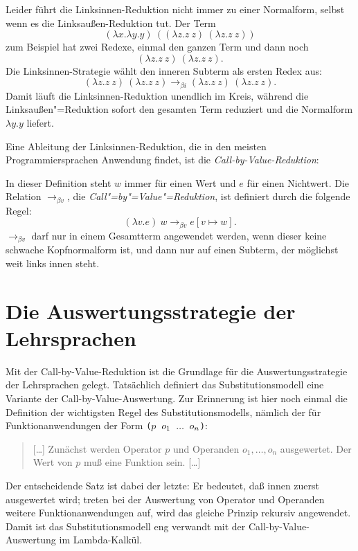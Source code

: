 %
Leider führt die Linksinnen-Reduktion nicht immer zu einer Normalform,
selbst wenn es die Linksaußen-Reduktion tut.  Der Term
\[ (\lambda x.\lambda y.y)~((\lambda z.z~z)~(\lambda z.z~z)) \]
zum Beispiel hat zwei Redexe, einmal den ganzen Term und dann noch
\[(\lambda z.z~z)~(\lambda z.z~z).\]  Die Linksinnen-Strategie wählt
den inneren Subterm als ersten Redex aus:
%
\begin{displaymath}
  (\lambda z.z~z)~(\lambda z.z~z)
\rightarrow_{\beta i}
  (\lambda z.z~z)~(\lambda z.z~z).
\end{displaymath}
%
Damit läuft die Linksinnen-Reduktion unendlich im Kreis, während
die Linksaußen"=Reduktion sofort den gesamten Term reduziert und die
Normalform $\lambda y.y$ liefert.

Eine Ableitung der Linksinnen-Reduktion, die in den meisten
Programmiersprachen Anwendung findet, ist die
\textit{Call-by-Value-Reduktion}:
%
\begin{definition}\label{def:call-by-value}
  In dieser Definition steht $w$ immer für einen Wert und $e$ für
  einen Nichtwert.  Die Relation $\rightarrow_{\beta v}$, die
  \textit{Call"=by"=Value"=Reduktion}, ist definiert durch die
  folgende Regel:
  \begin{displaymath}
    (\lambda v.e)~w \rightarrow_{\beta v} e[v \mapsto w].
  \end{displaymath}
  $\rightarrow_{\beta v}$ darf nur in einem Gesamtterm angewendet
  werden, wenn dieser keine schwache Kopfnormalform ist,
  und dann nur auf einen Subterm, der möglichst weit links innen steht.
\end{definition}

\section{Die Auswertungsstrategie der Lehrsprachen}
\label{sec:scheme-auswertung}

Mit der Call-by-Value-Reduktion ist die Grundlage für die
Auswertungsstrategie der Lehrsprachen gelegt.  Tatsächlich definiert das
Substitutionsmodell eine Variante der
Call-by-Value-Auswertung.  Zur Erinnerung ist hier noch einmal die
Definition der wichtigsten Regel des Substitutionsmodells, nämlich der für
Funktionanwendungen der Form \texttt{(\(p\) \(o\sb{1}\) \(\ldots\) \(o\sb{n}\))}:
%
\begin{quote}
  [\ldots] Zunächst werden Operator $p$ und Operanden $o_1, \ldots, o_n$
  ausgewertet.  Der Wert von $p$ muß eine Funktion sein. [\ldots]
\end{quote}
%
Der entscheidende Satz ist dabei der letzte:
Er bedeutet, daß innen zuerst ausgewertet wird;
treten bei der Auswertung von Operator und Operanden weitere
Funktionanwendungen auf, wird das gleiche Prinzip rekursiv angewendet.
Damit ist das Substitutionsmodell eng verwandt mit der
Call-by-Value-Auswertung im Lambda-Kalkül.

